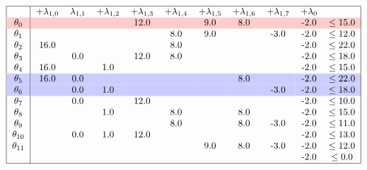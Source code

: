 \documentclass{article}
\begin{document}
    \[
        \begin{tabular}{ |c|c c c c c c c c c c| }
            \hline
            & +$\lambda_{1,0}$ & $\lambda_{1,1}$ & +$\lambda_{1,2}$ & +$\lambda_{1,3}$ & +$\lambda_{1,4}$ & +$\lambda_{1,5}$ & +$\lambda_{1,6}$ & +$\lambda_{1,7}$  & +$\lambda_{0}$ &  \\
            \rowcolor{red!20}
            $\theta_{0}$ && & & 12.0 && 9.0 &8.0 && -2.0& $\leq 15.0$ \\
            $\theta_{1}$ && & & & 8.0 &9.0 && -3.0 &-2.0& $\leq 12.0$ \\
            $\theta_{2}$ &16.0 && & & 8.0 && & & -2.0& $\leq 22.0$ \\
            $\theta_{3}$ && 0.0 && 12.0 &8.0 && & & -2.0& $\leq 18.0$ \\
            $\theta_{4}$ &16.0 && 1.0 && & & & & -2.0& $\leq 15.0$ \\
            \rowcolor{blue!20}
            $\theta_{5}$ &16.0 &0.0 && & & & 8.0 && -2.0& $\leq 22.0$ \\
            \rowcolor{blue!20}
            $\theta_{6}$ && 0.0 &1.0 && & & & -3.0 &-2.0& $\leq 18.0$ \\
            $\theta_{7}$ && 0.0 && 12.0 && & & & -2.0& $\leq 10.0$ \\
            $\theta_{8}$ && & 1.0 && 8.0 && 8.0 && -2.0& $\leq 15.0$ \\
            $\theta_{9}$ && & & & 8.0 && 8.0 &-3.0 &-2.0& $\leq 11.0$ \\
            $\theta_{10}$ && 0.0 &1.0 &12.0 && & & & -2.0& $\leq 13.0$ \\
            $\theta_{11}$ && & & & & 9.0 &8.0 &-3.0 &-2.0& $\leq 12.0$ \\
            && & & & &  && & -2.0 & $\leq 0.0$ \\
            \hline
        \end{tabular}
    \]
\end{document}
